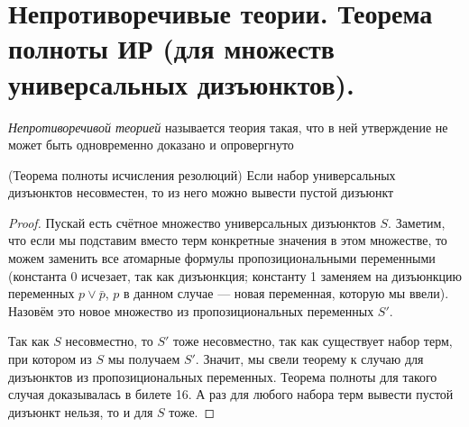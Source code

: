 \documentclass{article}
\begin{document}
\section{Непротиворечивые теории. Теорема полноты ИР (для множеств универсальных дизъюнктов).}

\begin{definition}
	\textit{Непротиворечивой теорией} называется теория такая, что в ней утверждение не может быть одновременно доказано и опровергнуто
\end{definition}

\begin{theorem}{(Теорема полноты исчисления резолюций)}
	Если набор универсальных дизъюнктов несовместен, то из него можно вывести пустой дизъюнкт
\end{theorem}
\begin{proof}
	Пускай есть счётное множество универсальных дизъюнктов $S$. Заметим, что если мы подставим вместо терм конкретные значения в этом множестве, то можем заменить все атомарные формулы пропозициональными переменными (константа 0 исчезает, так как дизъюнкция; константу 1 заменяем на дизъюнкцию переменных $p \vee \bar p$, $p$ в данном случае --- новая переменная, которую мы ввели). Назовём это новое множество из пропозициональных переменных $S'$.
	
	Так как $S$ несовместно, то $S'$ тоже несовместно, так как существует набор терм, при котором из $S$ мы получаем $S'$. Значит, мы свели теорему к случаю для дизъюнктов из пропозициональных переменных. Теорема полноты для такого случая доказывалась в билете 16. А раз для любого набора терм вывести пустой дизъюнкт нельзя, то и для $S$ тоже. 
\end{proof}
\end{document}
